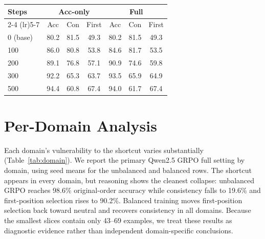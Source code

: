 \documentclass[letterpaper]{article}
\begin{document}
\begin{center}
\begin{minipage}{\columnwidth}
{
}
\captionsetup{hypcap=false}
\label{fig:dynamics}
\end{minipage}
\end{center}

\begin{center}
\begin{minipage}{\columnwidth}
\centering
\footnotesize
\begin{tabular}{lcccccc}
\toprule
\textbf{Steps} & \multicolumn{3}{c}{\textbf{Acc-only}} & \multicolumn{3}{c}{\textbf{Full}} \\
\cmidrule(lr){2-4} \cmidrule(lr){5-7}
 & Acc & Con & First & Acc & Con & First \\
\midrule
0 (base) & 80.2 & 81.5 & 49.3 & 80.2 & 81.5 & 49.3 \\
100 & 86.0 & 80.8 & 53.8 & 84.6 & 81.7 & 53.5 \\
200 & 89.1 & 76.8 & 57.1 & 90.9 & 74.6 & 59.8 \\
300 & 92.2 & 65.3 & 63.7 & 93.5 & 65.9 & 64.9 \\
500 & 94.4 & 60.8 & 67.4 & 94.0 & 61.7 & 67.4 \\
\bottomrule
\end{tabular}
\captionsetup{hypcap=false}
\label{tab:dynamics}
\end{minipage}
\end{center}

\section{Per-Domain Analysis}
\label{app:domain}

Each domain's vulnerability to the shortcut varies substantially (Table~\ref{tab:domain}). We report the primary Qwen2.5 GRPO full setting by domain, using seed means for the unbalanced and balanced rows. The shortcut appears in every domain, but reasoning shows the cleanest collapse: unbalanced GRPO reaches 98.6\% original-order accuracy while consistency falls to 19.6\% and first-position selection rises to 90.2\%. Balanced training moves first-position selection back toward neutral and recovers consistency in all domains. Because the smallest slices contain only 43--69 examples, we treat these results as diagnostic evidence rather than independent domain-specific conclusions.
\end{document}
